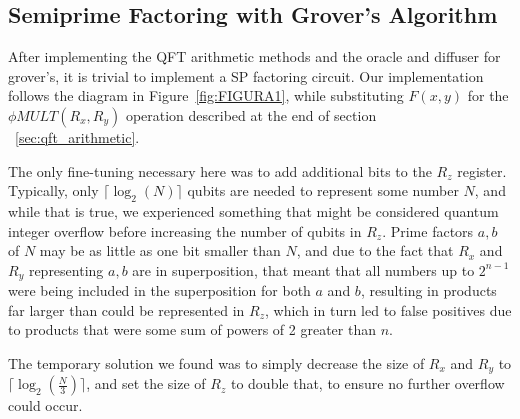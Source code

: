 \documentclass[twocolumn]{cinc}
\begin{document}
  \subsection{Semiprime Factoring with Grover's Algorithm}

  After implementing the QFT arithmetic methods and the oracle and diffuser for
  grover's, it is trivial to implement a SP factoring circuit. Our implementation
  follows the diagram in Figure~\ref{fig:FIGURA1}, while substituting $F(x,y)$ for
  the $\phi MULT(R_x, R_y)$ operation described at the end of section 
  \ \ref{sec:qft_arithmetic}.

  The only fine-tuning necessary here was to add additional bits to the $R_z$ register.
  Typically, only $\lceil \log_2(N)\rceil$ qubits are needed to represent some number $N$,
  and while that is true, we experienced something that might be considered quantum integer
  overflow before increasing the number of qubits in $R_z$. Prime factors $a,b$ of $N$ may be as
  little as one bit smaller than $N$, and due to the fact that $R_x$ and $R_y$ representing $a,b$
  are in superposition, that meant that all numbers up to $2^{n-1}$ were being included
  in the superposition for both $a$ and $b$, resulting in products far larger than could
  be represented in $R_z$, which in turn led to false positives due to products that were
  some sum of powers of 2 greater than $n$.

  The temporary solution we found was to simply decrease the size of $R_x$ and $R_y$ to 
  $\lceil \log_2(\frac{N}{3})\rceil$, and set the size of $R_z$ to double that, to ensure no
  further overflow could occur.



\end{document}
